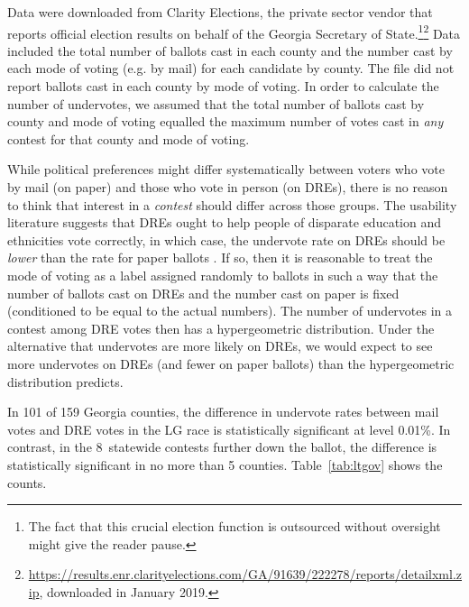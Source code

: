 \documentclass[runningheads]{llncs}
\begin{document}
Data were downloaded from Clarity Elections, the private sector vendor that reports official
election results on behalf of the Georgia Secretary of State.\footnote{%
  The fact that this crucial election function is outsourced without oversight might give
  the reader pause.
}\footnote{%
\url{https://results.enr.clarityelections.com/GA/91639/222278/reports/detailxml.zip}, downloaded in January 2019.
}
Data included the total number of ballots cast in each county and 
the number cast by each mode of voting (e.g. by mail) for each candidate by county.
The file did not report ballots cast in each county by mode of voting.
In order to calculate the number of undervotes, 
we assumed that the total number of ballots cast by county and mode of voting equalled the maximum number of votes cast in \emph{any} contest for that county and mode of voting.

While political preferences might differ systematically between voters who vote by mail (on paper)
and those who vote in person (on DREs), 
there is no reason to think that interest in a \emph{contest} should differ across those groups.
The usability literature suggests that DREs ought to help people of disparate education and ethnicities vote correctly, in which case, the undervote rate on DREs should be \emph{lower} than the rate for paper ballots \cite{tomz2003does}.
If so, then it is reasonable to treat the mode of voting as a label assigned randomly
to ballots in such a way that the number of ballots cast on DREs and the number cast on paper
is fixed (conditioned to be equal to the actual numbers).
The number of undervotes in a contest among DRE votes then has a hypergeometric distribution.
Under the alternative that undervotes are more likely on DREs, we would expect to see more undervotes on DREs (and fewer on paper ballots) than the hypergeometric distribution predicts.

In 101 of 159 Georgia counties, the difference in undervote rates between mail votes and DRE votes in the LG race is statistically significant at level 0.01\%.
In contrast, in the 8~statewide contests further down the ballot,
the difference is statistically significant in no more than 5 counties.
Table~\ref{tab:ltgov} shows the counts.
\end{document}
